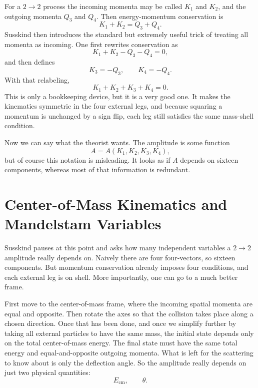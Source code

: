 For a \(2\to2\) process the incoming momenta may be called \(K_1\) and \(K_2\), and the outgoing momenta \(Q_3\) and \(Q_4\). Then energy-momentum conservation is
\begin{equation}
K_1+K_2=Q_3+Q_4.
\end{equation}
Susskind then introduces the standard but extremely useful trick of treating all momenta as incoming. One first rewrites conservation as
\begin{equation}
K_1+K_2-Q_3-Q_4=0,
\end{equation}
and then defines
\begin{equation}
K_3=-Q_3,\qquad K_4=-Q_4.
\end{equation}
With that relabeling,
\begin{equation}
K_1+K_2+K_3+K_4=0.
\end{equation}
This is only a bookkeeping device, but it is a very good one. It makes the kinematics symmetric in the four external legs, and because squaring a momentum is unchanged by a sign flip, each leg still satisfies the same mass-shell condition.

Now we can say what the theorist wants. The amplitude is some function
\begin{equation}
A=A(K_1,K_2,K_3,K_4),
\end{equation}
but of course this notation is misleading. It looks as if \(A\) depends on sixteen components, whereas most of that information is redundant.

\section{Center-of-Mass Kinematics and Mandelstam Variables}

Susskind pauses at this point and asks how many independent variables a \(2\to2\) amplitude really depends on. Naively there are four four-vectors, so sixteen components. But momentum conservation already imposes four conditions, and each external leg is on shell. More importantly, one can go to a much better frame.

First move to the center-of-mass frame, where the incoming spatial momenta are equal and opposite. Then rotate the axes so that the collision takes place along a chosen direction. Once that has been done, and once we simplify further by taking all external particles to have the same mass, the initial state depends only on the total center-of-mass energy. The final state must have the same total energy and equal-and-opposite outgoing momenta. What is left for the scattering to know about is only the deflection angle. So the amplitude really depends on just two physical quantities:
\begin{equation}
E_{\mathrm{cm}},\qquad \theta.
\end{equation}

